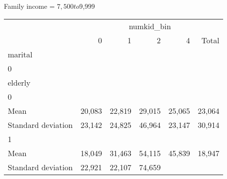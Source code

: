 Family income = $7,500 to $9,999
\begin{tabular}{llllll}
\cline{1-6}
\multicolumn{1}{c}{} &
  \multicolumn{5}{|c}{numkid\_bin} \\
\multicolumn{1}{c}{} &
  \multicolumn{1}{|r}{0} &
  \multicolumn{1}{r}{1} &
  \multicolumn{1}{r}{2} &
  \multicolumn{1}{r}{4} &
  \multicolumn{1}{r}{Total} \\
\cline{1-6}
\multicolumn{1}{l}{marital} &
  \multicolumn{1}{|r}{} &
  \multicolumn{1}{r}{} &
  \multicolumn{1}{r}{} &
  \multicolumn{1}{r}{} &
  \multicolumn{1}{r}{} \\
\multicolumn{1}{l}{\hspace{1em}0} &
  \multicolumn{1}{|r}{} &
  \multicolumn{1}{r}{} &
  \multicolumn{1}{r}{} &
  \multicolumn{1}{r}{} &
  \multicolumn{1}{r}{} \\
\multicolumn{1}{l}{\hspace{2em}elderly} &
  \multicolumn{1}{|r}{} &
  \multicolumn{1}{r}{} &
  \multicolumn{1}{r}{} &
  \multicolumn{1}{r}{} &
  \multicolumn{1}{r}{} \\
\multicolumn{1}{l}{\hspace{3em}0} &
  \multicolumn{1}{|r}{} &
  \multicolumn{1}{r}{} &
  \multicolumn{1}{r}{} &
  \multicolumn{1}{r}{} &
  \multicolumn{1}{r}{} \\
\multicolumn{1}{l}{\hspace{4em}Mean} &
  \multicolumn{1}{|r}{20,083} &
  \multicolumn{1}{r}{22,819} &
  \multicolumn{1}{r}{29,015} &
  \multicolumn{1}{r}{25,065} &
  \multicolumn{1}{r}{23,064} \\
\multicolumn{1}{l}{\hspace{4em}Standard deviation} &
  \multicolumn{1}{|r}{23,142} &
  \multicolumn{1}{r}{24,825} &
  \multicolumn{1}{r}{46,964} &
  \multicolumn{1}{r}{23,147} &
  \multicolumn{1}{r}{30,914} \\
\multicolumn{1}{l}{\hspace{3em}1} &
  \multicolumn{1}{|r}{} &
  \multicolumn{1}{r}{} &
  \multicolumn{1}{r}{} &
  \multicolumn{1}{r}{} &
  \multicolumn{1}{r}{} \\
\multicolumn{1}{l}{\hspace{4em}Mean} &
  \multicolumn{1}{|r}{18,049} &
  \multicolumn{1}{r}{31,463} &
  \multicolumn{1}{r}{54,115} &
  \multicolumn{1}{r}{45,839} &
  \multicolumn{1}{r}{18,947} \\
\multicolumn{1}{l}{\hspace{4em}Standard deviation} &
  \multicolumn{1}{|r}{22,921} &
  \multicolumn{1}{r}{22,107} &
  \multicolumn{1}{r}{74,659} &

\end{tabular}

